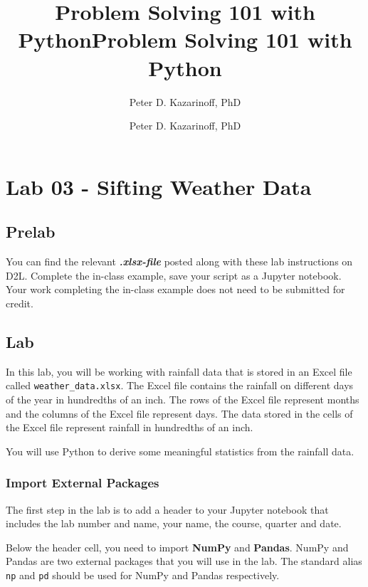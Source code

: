 \documentclass[11pt]{article}
\title{Problem Solving 101 with Python}
\author{Peter D. Kazarinoff, PhD}
\date{}
\title{Problem Solving 101 with Python}
\author{Peter D. Kazarinoff, PhD}
\date{}
\begin{document}
    
    
    

    
    

    
    \hypertarget{lab-03---sifting-weather-data}{%
\section{Lab 03 - Sifting Weather
Data}\label{lab-03---sifting-weather-data}}

    \hypertarget{prelab}{%
\subsection{Prelab}\label{prelab}}

You can find the relevant \textbf{\emph{.xlsx-file}} posted along with
these lab instructions on D2L. Complete the in-class example, save your
script as a Jupyter notebook. Your work completing the in-class example
does not need to be submitted for credit.

    \hypertarget{lab}{%
\subsection{Lab}\label{lab}}

In this lab, you will be working with rainfall data that is stored in an
Excel file called \texttt{weather\_data.xlsx}. The Excel file contains
the rainfall on different days of the year in hundredths of an inch. The
rows of the Excel file represent months and the columns of the Excel
file represent days. The data stored in the cells of the Excel file
represent rainfall in hundredths of an inch.

You will use Python to derive some meaningful statistics from the
rainfall data.

    \hypertarget{import-external-packages}{%
\subsubsection{Import External
Packages}\label{import-external-packages}}

The first step in the lab is to add a header to your Jupyter notebook
that includes the lab number and name, your name, the course, quarter
and date.

Below the header cell, you need to import \textbf{NumPy} and
\textbf{Pandas}. NumPy and Pandas are two external packages that you
will use in the lab. The standard alias \texttt{np} and \texttt{pd}
should be used for NumPy and Pandas respectively.
\end{document}
